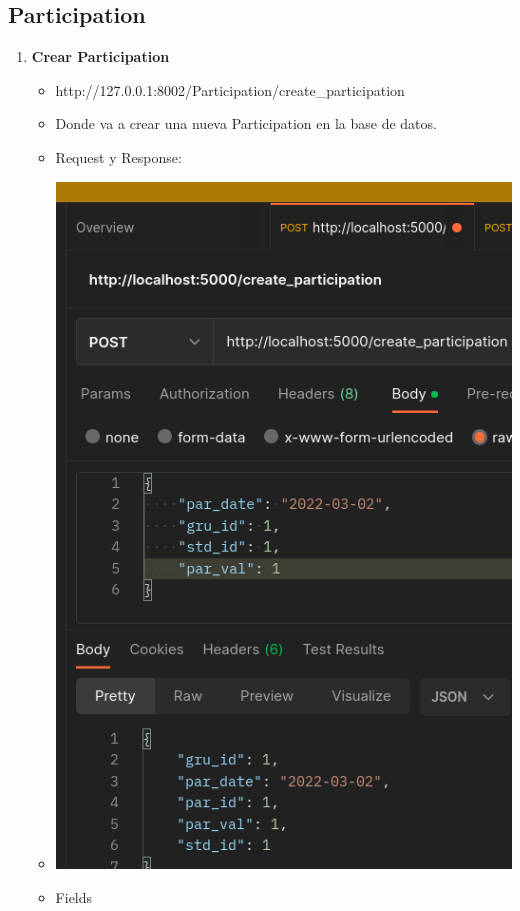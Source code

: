 \documentclass{article}
\begin{document}
\subsection{Participation}
\begin{enumerate}
    \item \textbf{Crear Participation}
    \begin{itemize}
        \item http://127.0.0.1:8002/Participation/create\_participation
        \item Donde va a crear una nueva Participation en la base de datos.
        \item Request y Response:
        \item \includegraphics[scale=.5]{assets/participation/create.png}
        \item Fields
        \begin{table}[H] \centering \begin{tabular}{|l|l|l|l|} \hline

\end{tabular}
\end{table}
\end{itemize}
\end{enumerate}
\end{document}
